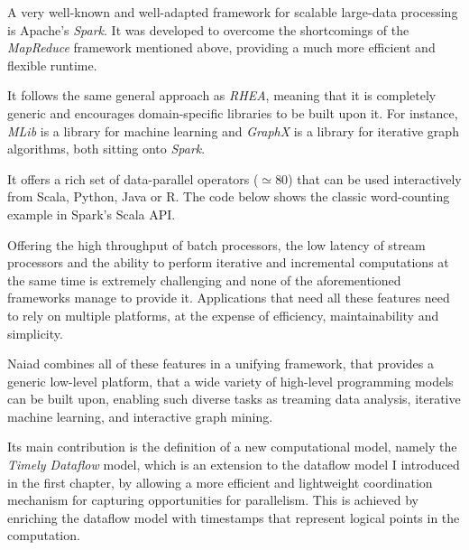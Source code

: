 \documentclass{dithesis}
\begin{document}


A very well-known and well-adapted framework for scalable large-data processing is Apache's \textit{Spark}. It was developed to overcome the shortcomings of the \textit{MapReduce} framework mentioned above, providing a much more efficient and flexible runtime.

It follows the same general approach as \textit{RHEA}, meaning that it is completely generic and encourages domain-specific libraries to be built upon it. For instance, \textit{MLib} is a library for machine learning and \textit{GraphX} is a library for iterative graph algorithms, both sitting onto \textit{Spark}.

It offers a rich set of data-parallel operators ($\simeq 80$) that can be used interactively from Scala, Python, Java or R. The code below shows the classic word-counting example in Spark's Scala API.



Offering the high throughput of batch processors, the low latency of stream processors and the ability to perform iterative and incremental computations at the same time is extremely challenging and none of the aforementioned frameworks manage to provide it. Applications that need all these features need to rely on multiple platforms, at the expense of efficiency, maintainability and simplicity.

Naiad\cite{naiad} combines all of these features in a unifying framework, that provides a generic low-level platform, that a wide variety of high-level programming models can be built upon, enabling such diverse tasks as treaming data analysis, iterative machine learning, and interactive graph mining.

Its main contribution is the definition of a new computational model, namely the \textit{Timely Dataflow} model, which is an extension to the dataflow model I introduced in the first chapter, by allowing a more efficient and lightweight coordination mechanism for capturing opportunities for parallelism. This is achieved by enriching the dataflow model with timestamps that represent logical points in the computation.
\end{document}

